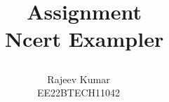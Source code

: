 \documentclass[journal,12pt,onecolumn]{IEEEtran}
\theoremstyle{remark}
\begin{document}
%




\vspace{3cm}
\title{
\Huge\ Assignment \\
\Huge\ Ncert Exampler\\
\large\author{Rajeev Kumar \\EE22BTECH11042}                                                                      
}


%
%
%

% 
%



% 
\end{document}
